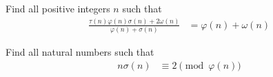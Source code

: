 \begin{problem} %
	Find all positive integers $n$ such that
		\begin{align*}
			\frac{\tau(n)\varphi( n)\sigma(n)+2\omega(n)}{\varphi( n)+\sigma(n)}
				& =\varphi( n)+\omega(n)
		\end{align*}
\end{problem}

\begin{problem}[IMS 2008] %
	Find all natural numbers such that
		\begin{align*}
			n\sigma(n)
				& \equiv 2\pmod {\varphi( n)}
		\end{align*}
\end{problem}
